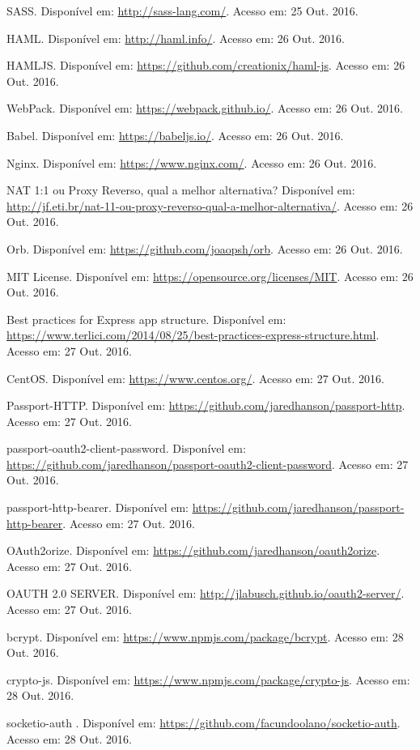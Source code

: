 \documentclass[brazil,ruledheader]{abntifes}
\begin{document}
\begin{thebibliography}{9}
		SASS. Disponível em: \url{http://sass-lang.com/}.
		Acesso em: 25 Out. 2016.
		
		HAML. Disponível em: \url{http://haml.info/}.
		Acesso em: 26 Out. 2016.
		
		HAMLJS. Disponível em: \url{https://github.com/creationix/haml-js}.
		Acesso em: 26 Out. 2016.
		
		WebPack. Disponível em: \url{https://webpack.github.io/}.
		Acesso em: 26 Out. 2016.
		
		Babel. Disponível em: \url{https://babeljs.io/}.
		Acesso em: 26 Out. 2016.
		
		Nginx. Disponível em: \url{https://www.nginx.com/}.
		Acesso em: 26 Out. 2016.
		
		NAT 1:1 ou Proxy Reverso, qual a melhor alternativa? Disponível em: \url{http://jf.eti.br/nat-11-ou-proxy-reverso-qual-a-melhor-alternativa/}.
		Acesso em: 26 Out. 2016.
		
		Orb. Disponível em: \url{https://github.com/joaopsh/orb}.
		Acesso em: 26 Out. 2016.
		
		MIT License. Disponível em: \url{https://opensource.org/licenses/MIT}.
		Acesso em: 26 Out. 2016.
		
		Best practices for Express app structure. Disponível em: \url{https://www.terlici.com/2014/08/25/best-practices-express-structure.html}.
		Acesso em: 27 Out. 2016.
		
		CentOS. Disponível em: \url{https://www.centos.org/}.
		Acesso em: 27 Out. 2016.
		
		Passport-HTTP. Disponível em: \url{https://github.com/jaredhanson/passport-http}.
		Acesso em: 27 Out. 2016.
		
		passport-oauth2-client-password. Disponível em: \url{https://github.com/jaredhanson/passport-oauth2-client-password}.
		Acesso em: 27 Out. 2016.
		
		passport-http-bearer. Disponível em: \url{https://github.com/jaredhanson/passport-http-bearer}.
		Acesso em: 27 Out. 2016.
		
		OAuth2orize. Disponível em: \url{https://github.com/jaredhanson/oauth2orize}.
		Acesso em: 27 Out. 2016.
		
		OAUTH 2.0 SERVER. Disponível em: \url{http://jlabusch.github.io/oauth2-server/}.
		Acesso em: 27 Out. 2016.
		
		bcrypt. Disponível em: \url{https://www.npmjs.com/package/bcrypt}.
		Acesso em: 28 Out. 2016.
		
		crypto-js. Disponível em: \url{https://www.npmjs.com/package/crypto-js}.
		Acesso em: 28 Out. 2016.
		
		socketio-auth . Disponível em: \url{https://github.com/facundoolano/socketio-auth}.
		Acesso em: 28 Out. 2016.
	\end{thebibliography}
		\anexo
	
\end{document}
